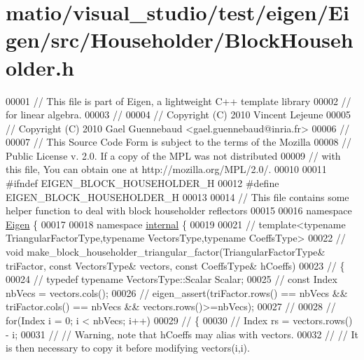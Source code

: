 \hypertarget{matio_2visual__studio_2test_2eigen_2_eigen_2src_2_householder_2_block_householder_8h_source}{}\section{matio/visual\+\_\+studio/test/eigen/\+Eigen/src/\+Householder/\+Block\+Householder.h}
\label{matio_2visual__studio_2test_2eigen_2_eigen_2src_2_householder_2_block_householder_8h_source}

\begin{DoxyCode}
00001 \textcolor{comment}{// This file is part of Eigen, a lightweight C++ template library}
00002 \textcolor{comment}{// for linear algebra.}
00003 \textcolor{comment}{//}
00004 \textcolor{comment}{// Copyright (C) 2010 Vincent Lejeune}
00005 \textcolor{comment}{// Copyright (C) 2010 Gael Guennebaud <gael.guennebaud@inria.fr>}
00006 \textcolor{comment}{//}
00007 \textcolor{comment}{// This Source Code Form is subject to the terms of the Mozilla}
00008 \textcolor{comment}{// Public License v. 2.0. If a copy of the MPL was not distributed}
00009 \textcolor{comment}{// with this file, You can obtain one at http://mozilla.org/MPL/2.0/.}
00010 
00011 \textcolor{preprocessor}{#ifndef EIGEN\_BLOCK\_HOUSEHOLDER\_H}
00012 \textcolor{preprocessor}{#define EIGEN\_BLOCK\_HOUSEHOLDER\_H}
00013 
00014 \textcolor{comment}{// This file contains some helper function to deal with block householder reflectors}
00015 
00016 \textcolor{keyword}{namespace }\hyperlink{namespace_eigen}{Eigen} \{ 
00017 
00018 \textcolor{keyword}{namespace }\hyperlink{namespaceinternal}{internal} \{
00019   
00021 \textcolor{comment}{// template<typename TriangularFactorType,typename VectorsType,typename CoeffsType>}
00022 \textcolor{comment}{// void make\_block\_householder\_triangular\_factor(TriangularFactorType& triFactor, const VectorsType&
       vectors, const CoeffsType& hCoeffs)}
00023 \textcolor{comment}{// \{}
00024 \textcolor{comment}{//   typedef typename VectorsType::Scalar Scalar;}
00025 \textcolor{comment}{//   const Index nbVecs = vectors.cols();}
00026 \textcolor{comment}{//   eigen\_assert(triFactor.rows() == nbVecs && triFactor.cols() == nbVecs && vectors.rows()>=nbVecs);}
00027 \textcolor{comment}{// }
00028 \textcolor{comment}{//   for(Index i = 0; i < nbVecs; i++)}
00029 \textcolor{comment}{//   \{}
00030 \textcolor{comment}{//     Index rs = vectors.rows() - i;}
00031 \textcolor{comment}{//     // Warning, note that hCoeffs may alias with vectors.}
00032 \textcolor{comment}{//     // It is then necessary to copy it before modifying vectors(i,i). }

\end{DoxyCode}
